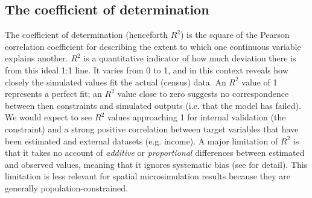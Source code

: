 \documentclass[a4paper,10pt]{article}
\begin{document}
\subsection{The coefficient of determination}
The coefficient of determination (henceforth $R^2$) is the 
square of the Pearson correlation coefficient for describing the
extent to which one continuous variable explains another.
$R^2$ is a quantitative
indicator of how much deviation there is from this ideal
1:1 line. It varies from 0 to 1,
and in this context reveals how closely the 
simulated values fit the actual (census) data.
An $R^2$ value of 1 represents a perfect fit; an $R^2$ value
close to zero suggests no correspondence
between then constraints and simulated outputs (i.e. that the model has failed).
We would expect to see $R^2$ values approaching 1 for
internal validation (the constraint) and a strong
positive correlation between target variables that have been estimated and
external datasets (e.g. income). A major limitation of $R^2$ is that
it takes no account of \emph{additive} or \emph{proportional} differences
between estimated and observed values, meaning that it ignores systematic
bias (see \citealp{Legates1999GOF} for detail).
This limitation is less relevant for spatial microsimulation results
because they are generally population-constrained. 



\end{document}
